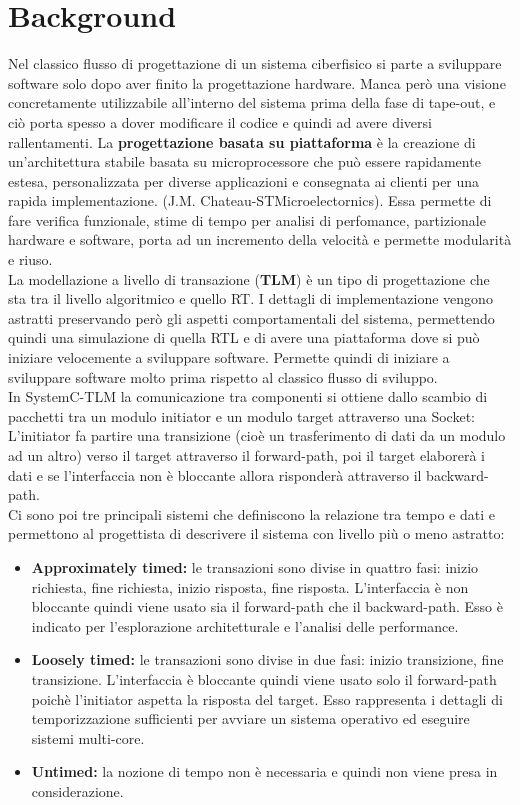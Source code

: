 \documentclass[]{IEEEtran}
\begin{document}
\section{Background}
Nel classico flusso di progettazione di un sistema ciberfisico si parte a sviluppare software solo dopo aver finito la progettazione hardware. Manca però una visione concretamente utilizzabile all'interno del sistema prima della fase di tape-out, e ciò porta spesso a dover modificare il codice e quindi ad avere diversi rallentamenti.
La \textbf{progettazione basata su piattaforma} è la creazione di un'architettura stabile basata su microprocessore che può essere rapidamente estesa, personalizzata per diverse applicazioni e consegnata ai clienti per una rapida implementazione. (J.M. Chateau-STMicroelectornics). Essa permette di fare verifica funzionale, stime di tempo per analisi di perfomance, partizionale hardware e software, porta ad un incremento della velocità e permette modularità e riuso.
\\La modellazione a livello di transazione (\textbf{TLM}) è un tipo di progettazione che sta tra il livello algoritmico e quello RT. I dettagli di implementazione vengono astratti preservando però gli aspetti comportamentali del sistema, permettendo quindi una simulazione di quella RTL e di avere una piattaforma dove si può iniziare velocemente a sviluppare software. Permette quindi di iniziare a sviluppare software molto prima rispetto al classico flusso di sviluppo.
\\In SystemC-TLM la comunicazione tra componenti si ottiene dallo scambio di pacchetti tra un modulo initiator e un modulo target attraverso una Socket: L'initiator fa partire una transizione (cioè un trasferimento di dati da un modulo ad un altro) verso il target attraverso il forward-path, poi il target elaborerà i dati e se l'interfaccia non è bloccante allora risponderà attraverso il backward-path.
\\Ci sono poi tre principali sistemi che definiscono la relazione tra tempo e dati e permettono al progettista di descrivere il sistema con livello più o meno astratto:
\begin{itemize}
    \item \textbf{Approximately timed: } le transazioni sono divise in quattro fasi: inizio richiesta, fine richiesta, inizio risposta, fine risposta. L'interfaccia è non bloccante quindi viene usato sia il forward-path che il backward-path. Esso è indicato per l'esplorazione architetturale e l'analisi delle performance.
    \item \textbf{Loosely timed: } le transazioni sono divise in due fasi: inizio transizione, fine transizione. L'interfaccia è bloccante quindi viene usato solo il forward-path poichè l'initiator aspetta la risposta del target. Esso rappresenta i dettagli di temporizzazione sufficienti per avviare un sistema operativo ed eseguire sistemi multi-core.
    \item \textbf{Untimed: } la nozione di tempo non è necessaria e quindi non viene presa in considerazione.
\end{itemize}
\end{document}
